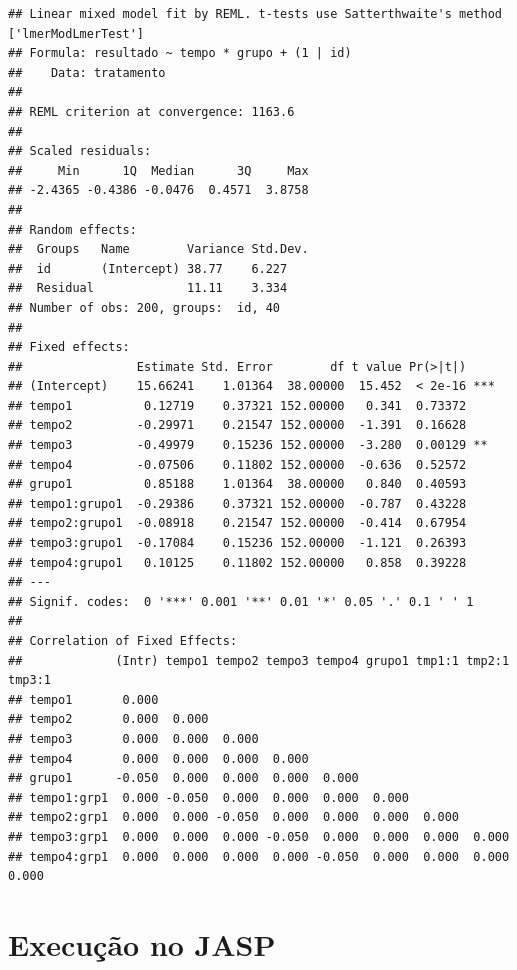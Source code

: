 \documentclass[
]{book}
\begin{document}
\begin{verbatim}
## Linear mixed model fit by REML. t-tests use Satterthwaite's method ['lmerModLmerTest']
## Formula: resultado ~ tempo * grupo + (1 | id)
##    Data: tratamento
## 
## REML criterion at convergence: 1163.6
## 
## Scaled residuals: 
##     Min      1Q  Median      3Q     Max 
## -2.4365 -0.4386 -0.0476  0.4571  3.8758 
## 
## Random effects:
##  Groups   Name        Variance Std.Dev.
##  id       (Intercept) 38.77    6.227   
##  Residual             11.11    3.334   
## Number of obs: 200, groups:  id, 40
## 
## Fixed effects:
##                Estimate Std. Error        df t value Pr(>|t|)    
## (Intercept)    15.66241    1.01364  38.00000  15.452  < 2e-16 ***
## tempo1          0.12719    0.37321 152.00000   0.341  0.73372    
## tempo2         -0.29971    0.21547 152.00000  -1.391  0.16628    
## tempo3         -0.49979    0.15236 152.00000  -3.280  0.00129 ** 
## tempo4         -0.07506    0.11802 152.00000  -0.636  0.52572    
## grupo1          0.85188    1.01364  38.00000   0.840  0.40593    
## tempo1:grupo1  -0.29386    0.37321 152.00000  -0.787  0.43228    
## tempo2:grupo1  -0.08918    0.21547 152.00000  -0.414  0.67954    
## tempo3:grupo1  -0.17084    0.15236 152.00000  -1.121  0.26393    
## tempo4:grupo1   0.10125    0.11802 152.00000   0.858  0.39228    
## ---
## Signif. codes:  0 '***' 0.001 '**' 0.01 '*' 0.05 '.' 0.1 ' ' 1
## 
## Correlation of Fixed Effects:
##             (Intr) tempo1 tempo2 tempo3 tempo4 grupo1 tmp1:1 tmp2:1 tmp3:1
## tempo1       0.000                                                        
## tempo2       0.000  0.000                                                 
## tempo3       0.000  0.000  0.000                                          
## tempo4       0.000  0.000  0.000  0.000                                   
## grupo1      -0.050  0.000  0.000  0.000  0.000                            
## tempo1:grp1  0.000 -0.050  0.000  0.000  0.000  0.000                     
## tempo2:grp1  0.000  0.000 -0.050  0.000  0.000  0.000  0.000              
## tempo3:grp1  0.000  0.000  0.000 -0.050  0.000  0.000  0.000  0.000       
## tempo4:grp1  0.000  0.000  0.000  0.000 -0.050  0.000  0.000  0.000  0.000
\end{verbatim}

\hypertarget{execuuxe7uxe3o-no-jasp-12}{%
\section{Execução no JASP}\label{execuuxe7uxe3o-no-jasp-12}}
\end{document}
